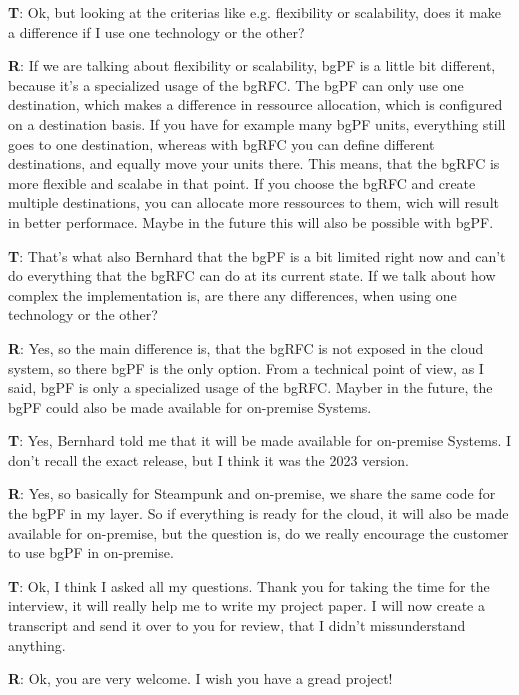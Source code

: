 \begin{list}{X:}{\setlength{\labelsep}{5mm}}
 \item[\textbf{T}:] Ok, but looking at the criterias like e.g. flexibility or scalability, does it make a difference if I use one technology or the other?
 \item[\textbf{R}:] If we are talking about flexibility or scalability, bgPF is a little bit different, because it's a specialized usage of the bgRFC. The bgPF can only use one destination, which makes a difference in ressource allocation, which is configured on a destination basis. If you have for example many bgPF units, everything still goes to one destination, whereas with bgRFC you can define different destinations, and equally move your units there. This means, that the bgRFC is more flexible and scalabe in that point. If you choose the bgRFC and create multiple destinations, you can allocate more ressources to them, wich will result in better performace. Maybe in the future this will also be possible with bgPF.
 \item[\textbf{T}:] That's what also Bernhard that the bgPF is a bit limited right now and can't do everything that the bgRFC can do at its current state. If we talk about how complex the implementation is, are there any differences, when using one technology or the other?
 \item[\textbf{R}:] Yes, so the main difference is, that the bgRFC is not exposed in the cloud system, so there bgPF is the only option. From a technical point of view, as I said, bgPF is only a specialized usage of the bgRFC. Mayber in the future, the bgPF could also be made available for on-premise Systems.
 \item[\textbf{T}:] Yes, Bernhard told me that it will be made available for on-premise Systems. I don't recall the exact release, but I think it was the 2023 version.
 \item[\textbf{R}:] Yes, so basically for Steampunk and on-premise, we share the same code for the bgPF in my layer. So if everything is ready for the cloud, it will also be made available for on-premise, but the question is, do we really encourage the customer to use bgPF in on-premise.
 \item[\textbf{T}:] Ok, I think I asked all my questions. Thank you for taking the time for the interview, it will really help me to write my project paper. I will now create a transcript and send it over to you for review, that I didn't missunderstand anything. 
 \item[\textbf{R}:] Ok, you are very welcome. I wish you have a gread project!
\end{list}

